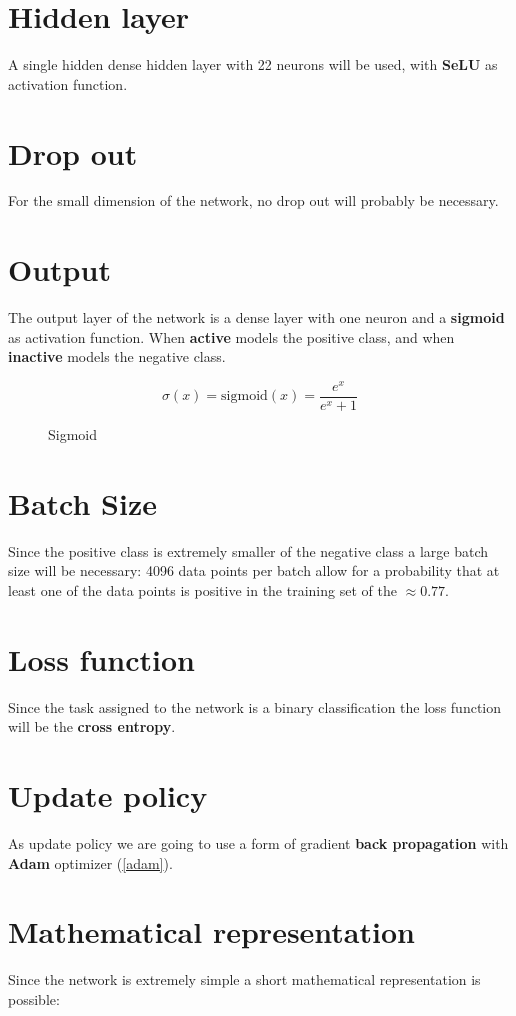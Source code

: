 \section{Hidden layer}
A single hidden dense hidden layer with 22 neurons will be used, with \textbf{SeLU} as activation function.

\section{Drop out}
For the small dimension of the network, no drop out will probably be necessary.

\section{Output}
The output layer of the network is a dense layer with one neuron and a \textbf{sigmoid} as activation function. When \textbf{active} models the positive class, and when \textbf{inactive} models the negative class.

\begin{figure}
	\[
		\sigma(x) = \text{sigmoid}(x) = \frac{e^x}{e^x + 1}
	\]
	\caption{Sigmoid}
\end{figure}

\section{Batch Size}
Since the positive class is extremely smaller of the negative class a large batch size will be necessary: 4096 data points per batch allow for a probability that at least one of the data points is positive in the training set of the \(\approx0.77\).

\section{Loss function}
Since the task assigned to the network is a binary classification the loss function will be the \textbf{cross entropy}.

\section{Update policy}
As update policy we are going to use a form of gradient \textbf{back propagation} with \textbf{Adam} optimizer (\ref{adam}).

\section{Mathematical representation}
Since the network is extremely simple a short mathematical representation is possible:

